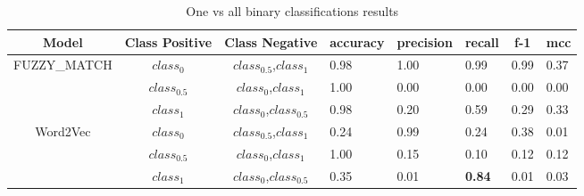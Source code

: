 \documentclass{ieeeaccess}
\begin{document}
\begin{table}[h!]
	\centering
	\caption{One vs all binary classifications results}
	\label{tab:evaluations}
	\begin{tabular}{|c|c|c|l|l|l|l|l|}
		\hline
		\textbf{Model}                                        & \textbf{Class Positive} & \textbf{Class Negative} & \multicolumn{1}{c|}{\textbf{accuracy}} & \multicolumn{1}{c|}{\textbf{precision}} & \multicolumn{1}{c|}{\textbf{recall}} & \multicolumn{1}{c|}{\textbf{f-1}} & \multicolumn{1}{c|}{\textbf{mcc}} \\ \hline
		\multirow{3}{*}{FUZZY\_MATCH}                         & $class_0$                     & $class_{0.5}$,$class_1$                   & 0.98                                   & 1.00                                    & 0.99                                 & 0.99                              & 0.37                              \\ \cline{2-8} 
		& $class_{0.5}$                     & $class_0$,$class_1$                   & 1.00                                   & 0.00                                    & 0.00                                 & 0.00                              & 0.00                              \\ \cline{2-8} 
		& $class_1$                       & $class_0$,$class_{0.5}$                 & 0.98                                   & 0.20                                    & 0.59                                 & 0.29                              & 0.33                              \\ \hline
		\multirow{3}{*}{Word2Vec}                             & $class_0$                     & $class_{0.5}$,$class_1$                   & 0.24                                   & 0.99                                    & 0.24                                 & 0.38                              & 0.01                              \\ \cline{2-8} 
		& $class_{0.5}$                     & $class_0$,$class_1$                   & 1.00                                   & 0.15                                    & 0.10                                 & 0.12                              & 0.12                              \\ \cline{2-8} 
		& $class_1$                       & $class_0$,$class_{0.5}$                 & 0.35                                   & 0.01                                    & \textbf{0.84}                        & 0.01                              & 0.03                              \\ \hline

\end{tabular}
\end{table}
\end{document}
